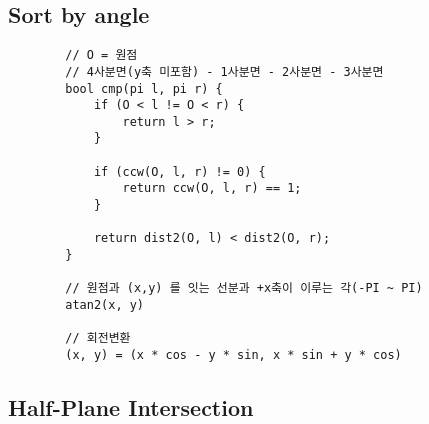 \documentclass[landscape, 8pt, a4paper, oneside, twocolumn]{extarticle}
\begin{document}
	\subsection{Sort by angle}
	\begin{verbatim}
		// O = 원점
		// 4사분면(y축 미포함) - 1사분면 - 2사분면 - 3사분면
		bool cmp(pi l, pi r) {
			if (O < l != O < r) {
				return l > r;
			}
			
			if (ccw(O, l, r) != 0) {
				return ccw(O, l, r) == 1;
			}
			
			return dist2(O, l) < dist2(O, r);
		}
	
		// 원점과 (x,y) 를 잇는 선분과 +x축이 이루는 각(-PI ~ PI)
		atan2(x, y)
		
		// 회전변환
		(x, y) = (x * cos - y * sin, x * sin + y * cos)
	\end{verbatim}
	\subsection{Half-Plane Intersection}
\end{document}
